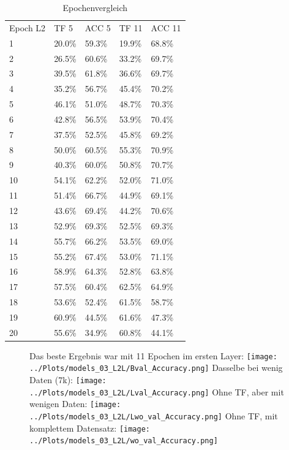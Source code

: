     \begin{table}[h!]
        \begin{center}
            \caption{Epochenvergleich}
            \label{tab4:Table}
            \begin{tabular}{l|l|l|l|l}
                Epoch L2 & TF 5 & ACC 5 & TF 11 & ACC 11 \\
                1 & 20.0\% & 59.3\% & 19.9\% & 68.8\% \\
                2 & 26.5\% & 60.6\% & 33.2\% & 69.7\% \\
                3 & 39.5\% & 61.8\% & 36.6\% & 69.7\% \\
                4 & 35.2\% & 56.7\% & 45.4\% & 70.2\% \\
                5 & 46.1\% & 51.0\% & 48.7\% & 70.3\% \\
                6 & 42.8\% & 56.5\% & 53.9\% & 70.4\% \\
                7 & 37.5\% & 52.5\% & 45.8\% & 69.2\% \\
                8 & 50.0\% & 60.5\% & 55.3\% & 70.9\% \\
                9 & 40.3\% & 60.0\% & 50.8\% & 70.7\% \\
                10 & 54.1\% & 62.2\% & 52.0\% & 71.0\% \\
                11 & 51.4\% & 66.7\% & 44.9\% & 69.1\% \\
                12 & 43.6\% & 69.4\% & 44.2\% & 70.6\% \\
                13 & 52.9\% & 69.3\% & 52.5\% & 69.3\% \\
                14 & 55.7\% & 66.2\% & 53.5\% & 69.0\% \\
                15 & 55.2\% & 67.4\% & 53.0\% & 71.1\% \\
                16 & 58.9\% & 64.3\% & 52.8\% & 63.8\% \\
                17 & 57.5\% & 60.4\% & 62.5\% & 64.9\% \\
                18 & 53.6\% & 52.4\% & 61.5\% & 58.7\% \\
                19 & 60.9\% & 44.5\% & 61.6\% & 47.3\% \\
                20 & 55.6\% & 34.9\% & 60.8\% & 44.1\% \\
            \end{tabular}
        \end{center}
    \end{table}

    \begin{figure}[htpb]
        Das beste Ergebnis war mit 11 Epochen im ersten Layer:
        \texttt{[image: ../Plots/models\_03\_L2L/Bval\_Accuracy.png]}
        Dasselbe bei wenig Daten (7k): 
        \texttt{[image: ../Plots/models\_03\_L2L/Lval\_Accuracy.png]}
        Ohne TF, aber mit wenigen Daten:
        \texttt{[image: ../Plots/models\_03\_L2L/Lwo\_val\_Accuracy.png]}
        Ohne TF, mit komplettem Datensatz: 
        \texttt{[image: ../Plots/models\_03\_L2L/wo\_val\_Accuracy.png]}
    \end{figure}

